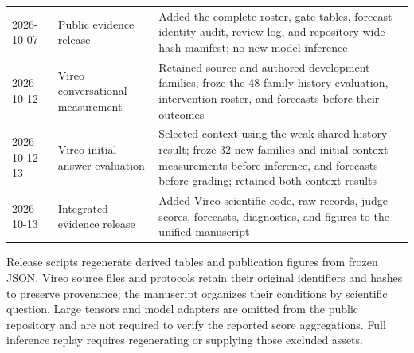 \documentclass[10pt]{article}
\begin{document}
\begin{table}[!tbp]
\begin{tabular}{@{}p{}p{}p{}@{}}
2026-10-07 & Public evidence release & Added the complete roster, gate
tables, forecast-identity audit, review log, and repository-wide hash
manifest; no new model inference \\
2026-10-12 & Vireo conversational measurement & Retained source and
authored development families; froze the 48-family history evaluation,
intervention roster, and forecasts before their outcomes \\
2026-10-12--13 & Vireo initial-answer evaluation & Selected context
using the weak shared-history result; froze 32 new families and
initial-context measurements before inference, and forecasts before
grading; retained both context results \\
2026-10-13 & Integrated evidence release & Added Vireo scientific code,
raw records, judge scores, forecasts, diagnostics, and figures to the
unified manuscript \\
\bottomrule
\end{tabular}
\end{table}

Release scripts regenerate derived tables and publication figures from
frozen JSON. Vireo source files and protocols retain their original
identifiers and hashes to preserve provenance; the manuscript organizes
their conditions by scientific question. Large tensors and model
adapters are omitted from the public repository and are not required to
verify the reported score aggregations. Full inference replay requires
regenerating or supplying those excluded assets.
\end{document}
